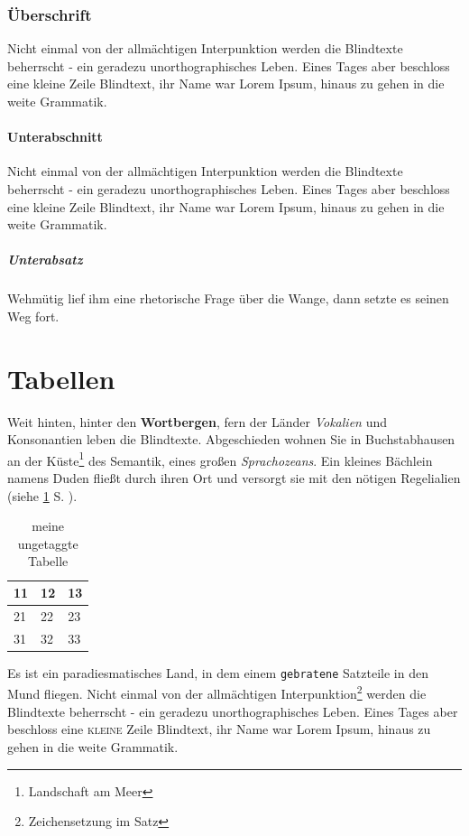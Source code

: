 \documentclass[%
	12pt,%
	a4paper,%
	oneside,%
 liststotoc, idxtotoc, bibtotoc, %
	halfparskip,%
	nochapterprefix,%
	appendixprefix, %
smallheadings,%
]{scrreprt}
\newcommand{\thead}[1]{\textbf{#1}}
\begin{document}
\subsection*{Überschrift}
Nicht einmal von der allmächtigen Interpunktion werden die Blindtexte beherrscht - ein geradezu unorthographisches Leben. Eines Tages aber beschloss eine kleine Zeile Blindtext, ihr Name war Lorem Ipsum, hinaus zu gehen in die weite Grammatik.

\subsubsection*{Unterabschnitt}
Nicht einmal von der allmächtigen Interpunktion werden die Blindtexte beherrscht - ein geradezu unorthographisches Leben. Eines Tages aber beschloss eine kleine Zeile Blindtext, ihr Name war Lorem Ipsum, hinaus zu gehen in die weite Grammatik.

\paragraph*{Unterabsatz}
Wehmütig lief ihm eine rhetorische Frage über die Wange, dann setzte es seinen Weg fort.

\chapter{Tabellen}
\label{sec:Tabellen}

Weit hinten, hinter den \textbf{Wortbergen}, fern der Länder \textit{Vokalien} und Konsonantien leben die Blindtexte. Abgeschieden wohnen Sie in Buchstabhausen an der Küste\footnote{Landschaft am Meer}
des Semantik, eines großen \textsl{Sprachozeans}. Ein kleines Bächlein namens Duden fließt durch ihren Ort und versorgt sie mit den nötigen Regelialien (siehe \ref{sec:Tabellen} S. \pageref{sec:Tabellen}).

\begin{table}[htbp]
	\centering
		\begin{tabular}{l|l l}
			\thead{11} & \thead{12} & \thead{13} \\ \hline
			21 & 22 & 23 \\
			31 & 32 & 33
		\end{tabular}
	\caption{meine ungetaggte Tabelle}
	\label{tab:meineUngetaggteTabelle}
\end{table}

Es ist ein paradiesmatisches Land, in dem einem \texttt{gebratene} Satzteile in den Mund fliegen. Nicht einmal von der allmächtigen Interpunktion\footnote{Zeichensetzung im Satz} werden die Blindtexte beherrscht - ein geradezu unorthographisches Leben. Eines Tages aber beschloss eine \textsc{kleine} Zeile Blindtext, ihr Name war Lorem Ipsum, hinaus zu gehen in die weite Grammatik.
\end{document}
